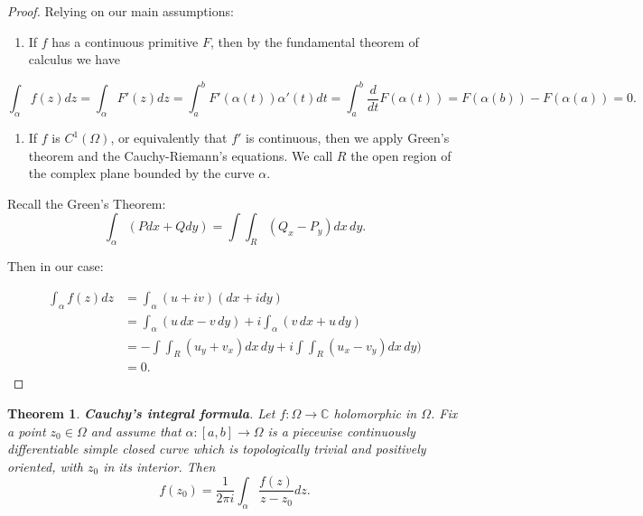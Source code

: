 \documentclass{amsart}
\newtheorem{thm}{Theorem}
\begin{document}
\begin{proof}
Relying on our main assumptions:

\begin{enumerate}
\item If \(f\) has a continuous primitive \(F\), then by the fundamental theorem of calculus we have
\end{enumerate}
\[ \int_{\alpha}f(z) dz = \int_{\alpha} F'(z) dz = \int_{a}^{b} F'(\alpha(t)) \alpha'(t) dt = \int_{a}^{b} \frac{d}{dt} F(\alpha(t)) = F(\alpha(b)) - F(\alpha(a)) = 0.\]

\begin{enumerate}
\item If \(f\) is \(C^1(\Omega)\), or equivalently that \(f'\) is continuous,  then we apply Green's theorem and the Cauchy-Riemann's equations. We call \(R\) the open region of the complex plane bounded by the curve \(\alpha\).
\end{enumerate}

Recall the Green's Theorem:
\[ \int_{\alpha} (Pdx + Qdy) = \int\int_{R} (Q_x - P_y) dx\, dy.\]

Then in our case:

\begin{align*}
 \int_{\alpha} f(z)dz & = \int_{\alpha} (u + i v) (dx + idy) \\ 
 &=\int_{\alpha} (u \, dx - v\, dy) + i \int_{\alpha} (v \, dx +  u\, dy) \\
 &= - \int\int_{R} (u_y +  v_x ) dx \, dy + i \int\int_{R} (u_x -  v_y) dx \, dy) \\
 &= 0.
\end{align*}
\end{proof}

\begin{thm}
\textbf{Cauchy's integral formula}. Let \(f:\Omega \to \mathbb{C}\) holomorphic in \(\Omega\). Fix a point \(z_0\in \Omega\) and assume that \(\alpha: [a,b] \to \Omega\) is a piecewise continuously differentiable simple closed curve which is topologically trivial and positively oriented, with \(z_0\) in its interior. Then
\[ f(z_0) = \frac{1}{2\pi i} \int_{\alpha}\frac{f(z)}{z-z_0}dz. \]
\end{thm}
\end{document}
